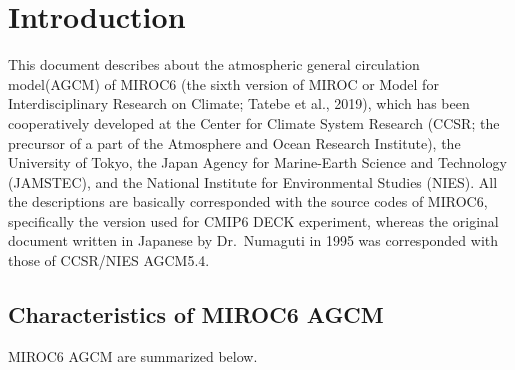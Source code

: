 \hypertarget{introduction}{%
\section{Introduction}\label{introduction}}

This document describes about the atmospheric general circulation
model(AGCM) of MIROC6 (the sixth version of MIROC or Model for
Interdisciplinary Research on Climate; Tatebe et al., 2019), which has
been cooperatively developed at the Center for Climate System Research
(CCSR; the precursor of a part of the Atmosphere and Ocean Research
Institute), the University of Tokyo, the Japan Agency for Marine-Earth
Science and Technology (JAMSTEC), and the National Institute for
Environmental Studies (NIES). All the descriptions are basically
corresponded with the source codes of MIROC6, specifically the version
used for CMIP6 DECK experiment, whereas the original document written in
Japanese by Dr.~Numaguti in 1995 was corresponded with those of
CCSR/NIES AGCM5.4.

\hypertarget{characteristics-of-miroc6-agcm}{%
\subsection{Characteristics of MIROC6
AGCM}\label{characteristics-of-miroc6-agcm}}

MIROC6 AGCM are summarized below.

